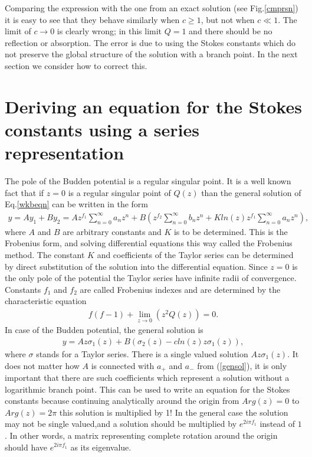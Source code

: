\documentclass[aps,prl,preprint,superscriptaddress]{revtex4}
\begin{document}
Comparing the expression with the one from an exact solution (see Fig.\ref{cmprsn}) it is easy to see that they behave similarly when \mbox{$c\geq1$}, but not when \mbox{$c\ll 1$}. The limit of \mbox{$c\rightarrow 0$} is clearly wrong; in this limit \mbox{$Q=1$}
and there should be no reflection or absorption. The error is due to using the Stokes constants which do not preserve the global structure of the solution with a branch point. In the next section we consider how to correct this. 

\section{Deriving an equation for the Stokes constants using a series representation \label{frob}}
The pole of the Budden potential is a regular singular point. It is a well known fact\cite[pp~68-76]{bender} that if \mbox{$z=0$} is a regular singular point of $Q(z)$ than the general solution of Eq.\ref{wkbeqn} can be written in the form
\begin{eqnarray}
y=A y_1+B y_2=
Az^{f_1}\sum_{n=0}^{\infty}{a_n z^n}+B(z^{f_2}\sum_{n=0}^{\infty}{b_n z^n}+Kln(z)z^{f_1}\sum_{n=0}^{\infty}{a_n z^n}),    \label{frobgensol}
\end{eqnarray}
where $A$ and $B$ are arbitrary constants and $K$ is to be determined. This is the Frobenius form, and solving differential equations this way called the Frobenius method. The constant $K$ and coefficients of the Taylor series can be determined by direct substitution of the solution into the differential equation. Since \mbox{$z=0$} is the only pole of the potential the Taylor series have infinite radii of convergence. Constants $f_1$ and $f_2$ are called Frobenius indexes and are determined by the characteristic equation
\begin{eqnarray}
f(f-1)+\lim_{z\rightarrow 0}(z^2Q(z))=0.   \label{chareq}
\end{eqnarray}
In case of the Budden potential, the general solution is
\begin{eqnarray}
y=A z \sigma_1(z)+B(\sigma_2(z) - c ln(z)z\sigma_1(z)),   \label{genfrobbud}
\end{eqnarray}
where $\sigma$ stands for a Taylor series. There is a single valued solution \mbox{$A z \sigma_1(z)$}. It does not matter how $A$ is connected with $a_+$ and $a_-$ from (\ref{gensol}), it is only important that there are such coefficients which represent a solution without a logarithmic branch point. This can be used to write an equation for the Stokes constants because continuing analytically around the origin from \mbox{$Arg(z)=0$} to \mbox{$Arg(z)=2\pi$} this solution is  multiplied by 1! In the general case the solution may not be single valued,and  a solution should be multiplied by $e^{2i\pi f_1}$ instead of $1$. In other words, a matrix representing complete rotation around the origin should have $e^{2i\pi f_1}$ as its eigenvalue. 
\end{document}
